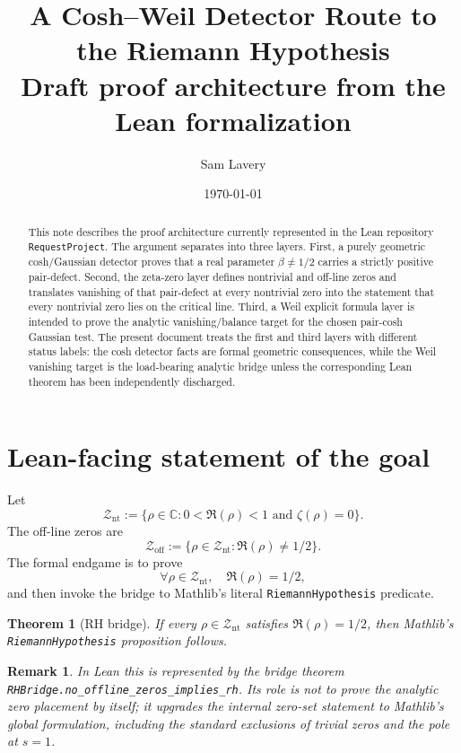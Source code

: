 \documentclass[11pt]{article}
\title{A Cosh--Weil Detector Route to the Riemann Hypothesis\\
\large Draft proof architecture from the Lean formalization}
\author{Sam Lavery}
\date{\today}
\newtheorem{theorem}{Theorem}
\newtheorem{remark}{Remark}
\newcommand{\C}{\mathbb C}
\newcommand{\zetaR}{\zeta}
\newcommand{\NTZ}{\mathcal Z_{\mathrm{nt}}}
\newcommand{\OLZ}{\mathcal Z_{\mathrm{off}}}
\begin{document}
\maketitle

\begin{abstract}
This note describes the proof architecture currently represented in the Lean repository
\texttt{RequestProject}.  The argument separates into three layers.  First, a purely
geometric cosh/Gaussian detector proves that a real parameter \(\beta\ne 1/2\) carries a
strictly positive pair-defect.  Second, the zeta-zero layer defines nontrivial and off-line
zeros and translates vanishing of that pair-defect at every nontrivial zero into the
statement that every nontrivial zero lies on the critical line.  Third, a Weil explicit
formula layer is intended to prove the analytic vanishing/balance target for the chosen
pair-cosh Gaussian test.  The present document treats the first and third layers with
different status labels: the cosh detector facts are formal geometric consequences, while
the Weil vanishing target is the load-bearing analytic bridge unless the corresponding
Lean theorem has been independently discharged.
\end{abstract}

\section{Lean-facing statement of the goal}

Let
\[
  \NTZ := \{\rho\in\C : 0<\Re(\rho)<1 \text{ and } \zetaR(\rho)=0\}.
\]
The off-line zeros are
\[
  \OLZ := \{\rho\in\NTZ : \Re(\rho)\ne 1/2\}.
\]
The formal endgame is to prove
\[
  \forall \rho\in\NTZ,\quad \Re(\rho)=1/2,
\]
and then invoke the bridge to Mathlib's literal \texttt{RiemannHypothesis} predicate.

\begin{theorem}[RH bridge]
If every \(\rho\in\NTZ\) satisfies \(\Re(\rho)=1/2\), then Mathlib's
\texttt{RiemannHypothesis} proposition follows.
\end{theorem}

\begin{remark}
In Lean this is represented by the bridge theorem
\texttt{RHBridge.no\_offline\_zeros\_implies\_rh}.  Its role is not to prove the
analytic zero placement by itself; it upgrades the internal zero-set statement to
Mathlib's global formulation, including the standard exclusions of trivial zeros and the
pole at \(s=1\).
\end{remark}
\end{document}

